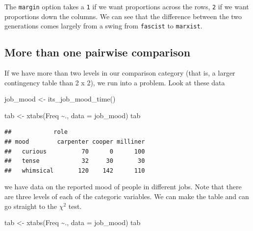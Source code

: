 \documentclass[
]{book}
\newenvironment{Shaded}{\begin{snugshade}}{\end{snugshade}}
\newcommand{\AttributeTok}[1]{\textcolor[rgb]{0.77,0.63,0.00}{#1}}
\newcommand{\FunctionTok}[1]{\textcolor[rgb]{0.00,0.00,0.00}{#1}}
\newcommand{\NormalTok}[1]{#1}
\newcommand{\OtherTok}[1]{\textcolor[rgb]{0.56,0.35,0.01}{#1}}
\newcommand{\SpecialCharTok}[1]{\textcolor[rgb]{0.00,0.00,0.00}{#1}}
\begin{document}
The \texttt{margin} option takes a \texttt{1} if we want proportions across the rows, \texttt{2} if we want proportions down the columns. We can see that the difference between the two generations comes largely from a swing from \texttt{fascist} to \texttt{marxist}.

\hypertarget{more-than-one-pairwise-comparison}{%
\subsection{More than one pairwise comparison}\label{more-than-one-pairwise-comparison}}

If we have more than two levels in our comparison category (that is, a larger contingency table than 2 x 2), we run into a problem. Look at these data

\begin{Shaded}
\begin{Highlighting}[]
\NormalTok{job\_mood }\OtherTok{\textless{}{-}} \FunctionTok{its\_job\_mood\_time}\NormalTok{()}
\end{Highlighting}
\end{Shaded}

\begin{Shaded}
\begin{Highlighting}[]
\NormalTok{tab }\OtherTok{\textless{}{-}} \FunctionTok{xtabs}\NormalTok{(Freq }\SpecialCharTok{\textasciitilde{}}\NormalTok{., }\AttributeTok{data =}\NormalTok{ job\_mood)}
\NormalTok{tab}
\end{Highlighting}
\end{Shaded}

\begin{verbatim}
##            role
## mood        carpenter cooper milliner
##   curious          70      0      100
##   tense            32     30       30
##   whimsical       120    142      110
\end{verbatim}

we have data on the reported mood of people in different jobs. Note that there are three levels of each of the categoric variables. We can make the table and can go straight to the \(\chi^2\) test.

\begin{Shaded}
\begin{Highlighting}[]
\NormalTok{tab }\OtherTok{\textless{}{-}} \FunctionTok{xtabs}\NormalTok{(Freq }\SpecialCharTok{\textasciitilde{}}\NormalTok{., }\AttributeTok{data =}\NormalTok{ job\_mood)}
\NormalTok{tab}
\end{Highlighting}
\end{Shaded}
\end{document}
